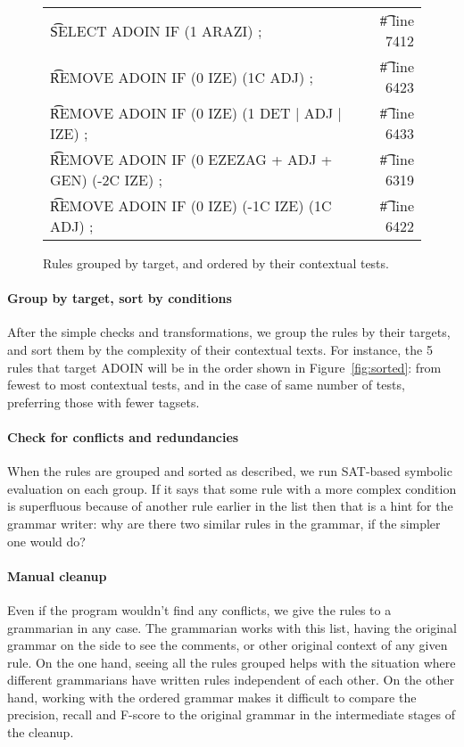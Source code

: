 {{\begin{figure*}[t]
\centering
\begin{tabular}{lr}
\t{SELECT ADOIN IF (1 ARAZI) ;}                         & \t{\# line 7412} \\
\t{REMOVE ADOIN IF (0 IZE) (1C ADJ) ;}                  & \t{\# line 6423} \\
\t{REMOVE ADOIN IF (0 IZE) (1 DET | ADJ | IZE) ;}       & \t{\# line 6433} \\
\t{REMOVE ADOIN IF (0 EZEZAG + ADJ + GEN) (-2C IZE) ;}  & \t{\# line 6319} \\
\t{REMOVE ADOIN IF (0 IZE) (-1C IZE) (1C ADJ) ;}        & \t{\# line 6422} \\
\end{tabular}
\caption{Rules grouped by target, and ordered by their contextual tests.}
\label{fig:basqueSorted}
\end{figure*}



\paragraph{Group by target, sort by conditions}
After the simple checks and transformations, we group the rules by their targets, and sort them by the complexity of their contextual texts. For instance, the 5 rules that target ADOIN will be in the order shown in Figure~\ref{fig:sorted}: from fewest to most contextual tests, and in the case of same number of tests, preferring those with fewer tagsets.


\paragraph{Check for conflicts and redundancies}

When the rules are grouped and sorted as described, we run SAT-based 
symbolic evaluation \cite{listenmaa_claessen2016} on each group. 
If it says that some rule with a more complex condition is superfluous 
because of another rule earlier in the list then that is a hint for the grammar writer: why are there two similar  rules in the grammar, if the simpler one would do?

\paragraph{Manual cleanup}
\label{manual} 

Even if the program wouldn't find any conflicts, we give the rules to 
a grammarian in any case. The grammarian works with this list, having 
the original grammar on the side to see the comments, or other original 
context of any given rule. 
On the one hand, seeing all the rules grouped helps with the 
situation where different grammarians have written rules independent of 
each other. On the other hand, working with the ordered grammar makes
it difficult to compare the precision, recall and F-score to the
original grammar in the intermediate stages of the cleanup. 

}}
